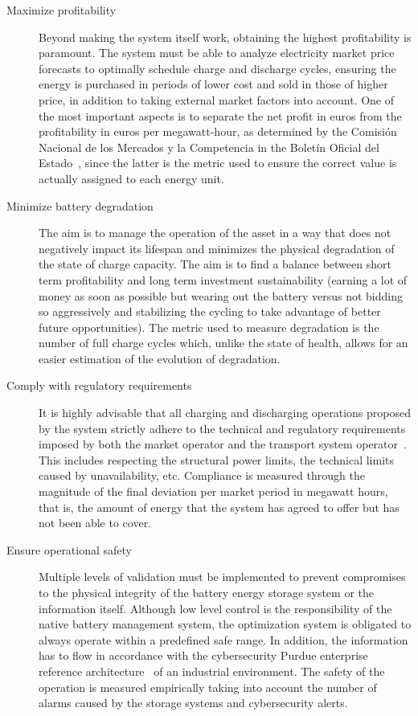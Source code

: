 \begin{description}

  \item[Maximize profitability] Beyond making the system itself work, obtaining the highest profitability is paramount. The system must be able to analyze electricity market price forecasts to optimally schedule charge and discharge cycles, ensuring the energy is purchased in periods of lower cost and sold in those of higher price, in addition to taking external market factors into account. One of the most important aspects is to separate the net profit in euros from the profitability in euros per megawatt-hour, as determined by the Comisión Nacional de los Mercados y la Competencia in the Boletín Oficial del Estado~\cite{cnmc2025resolucion}, since the latter is the metric used to ensure the correct value is actually assigned to each energy unit.

  \item[Minimize battery degradation] The aim is to manage the operation of the asset in a way that does not negatively impact its lifespan and minimizes the physical degradation of the state of charge capacity. The aim is to find a balance between short term profitability and long term investment sustainability (earning a lot of money as soon as possible but wearing out the battery versus not bidding so aggressively and stabilizing the cycling to take advantage of better future opportunities). The metric used to measure degradation is the number of full charge cycles which, unlike the state of health, allows for an easier estimation of the evolution of degradation.

  \item[Comply with regulatory requirements] It is highly advisable that all charging and discharging operations proposed by the system strictly adhere to the technical and regulatory requirements imposed by both the market operator and the transport system operator~\cite{crespo2004resolucion}. This includes respecting the structural power limits, the technical limits caused by unavailability, etc. Compliance is measured through the magnitude of the final deviation per market period in megawatt hours, that is, the amount of energy that the system has agreed to offer but has not been able to cover.

  \item[Ensure operational safety] Multiple levels of validation must be implemented to prevent compromises to the physical integrity of the battery energy storage system or the information itself. Although low level control is the responsibility of the native battery management system, the optimization system is obligated to always operate within a predefined safe range. In addition, the information has to flow in accordance with the cybersecurity Purdue enterprise reference architecture~\cite{williams1994purdue} of an industrial environment. The safety of the operation is measured empirically taking into account the number of alarms caused by the storage systems and cybersecurity alerts.


\end{description}
